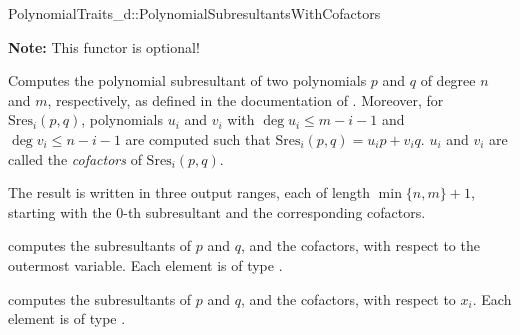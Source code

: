 \begin{ccRefConcept}{PolynomialTraits_d::PolynomialSubresultantsWithCofactors}

\textbf{Note:} This functor is optional!

\ccDefinition

Computes the polynomial subresultant of two polynomials $p$ and $q$ of degree
$n$ and $m$, respectively, 
as defined in the documentation of .
Moreover, for $\mathrm{Sres}_i(p,q)$, polynomials $u_i$ and $v_i$
with $\deg u_i\leq m-i-1$ and $\deg v_i\leq n-i-1$ are computed 
such that $\mathrm{Sres}_i(p,q)=u_i p + v_i q$. $u_i$ and $v_i$ are called
the \emph{cofactors} of $\mathrm{Sres}_i(p,q)$.
 
The result is written in three output ranges, each of length $\min\{n,m\}+1$, 
starting with the $0$-th subresultant and the corresponding cofactors.

\ccOperations
{}
         { computes the subresultants of $p$ and $q$, and the cofactors, 
           with respect to the outermost variable. Each element is of type
           .}

         { computes the subresultants of $p$ and $q$, and the cofactors, 
           with respect to $x_i$. Each element is of type
           .}


\ccSeeAlso

\\
\\
\\
\\
\\
\\

\end{ccRefConcept}
